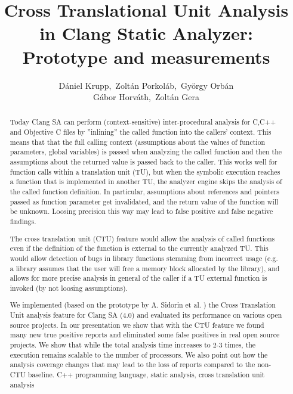 \documentclass{article}
\title{Cross Translational Unit Analysis in Clang Static Analyzer: Prototype and measurements}
\author{D\'aniel Krupp\inst1,\ Zolt\'an Porkol\'ab\inst1,\ Gy\"orgy Orb\'an\inst1\\
        G\'abor Horv\'ath\inst2,\ Zolt\'an Gera\inst2}
\institute{\inst1Ericsson Ltd., \inst2E\"{o}tv\"{o}s Lor\'{a}nd University, Faculty of Informatics\\
             \inst1\url{daniel.krupp@ericsson.com}, 
             \inst1\url{zoltan.porkolab@ericsson.com},
             \inst1\url{gyorgy.orban@ericsson.com},
             \inst2\url{xazax@caesar.elte.hu}, 
             \inst2\url{gerazo@caesar.elte.hu}}
\begin{document}
\maketitle


\begin{abstract}
Today Clang SA can perform (context-sensitive) inter-procedural analysis for 
C,C++ and Objective C files by ''inlining'' 
the called function into the callers' context. This means that that the full 
calling context
(assumptions about the values of function parameters, global variables) is passed when 
analyzing the called function and
then the assumptions about the returned value is passed back to the caller. 
This works well for function calls within a
translation unit (TU), but when the symbolic execution reaches a function that 
is implemented in another TU, the analyzer engine 
skips the analysis of the called function definition. In particular,
assumptions about references and pointers passed as function 
parameter get invalidated, and the return value of the function will be unknown.
Loosing precision this way may lead to false positive 
and false negative findings.

The cross translation unit (CTU) feature would allow the analysis of called 
functions even if the definition of the function is external to the currently 
analyzed TU. This would allow detection of bugs in library functions stemming
from incorrect usage (e.g. a library assumes that the user will free a memory 
  block allocated by the library), and allows for more precise analysis in 
general of the caller if a TU external function is invoked 
(by not loosing assumptions).

We implemented (based on the prototype by A. Sidorin et al. \cite{artemctu}) 
the Cross Translation Unit analysis feature for Clang SA (4.0) and evaluated 
its performance on various open source projects. In our presentation we show 
that with the CTU feature we found many new true positive reports and 
eliminated some false positives in real open source projects. We show that 
while the total analysis time increases to 2-3 times, the execution remains
scalable to the number of processors. We also point out how the analysis
coverage changes that may lead to the loss of reports compared to the 
non-CTU baseline.
\keywords C++ programming language, static analysis, cross translation unit analysis
\end{abstract}
\end{document}
